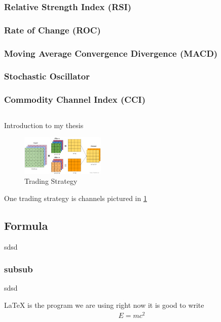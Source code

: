 \documentclass[a4paper,12pt]{report}
\begin{document}
			\subsubsection{Relative Strength Index (RSI)}
			\subsubsection{Rate of Change (ROC)}
			\subsubsection{Moving Average Convergence Divergence (MACD)}
			\subsubsection{Stochastic Oscillator}
			\subsubsection{Commodity Channel Index (CCI)}

		\subsection{}







Introduction to my thesis
\begin{figure}[h]
\begin{center}
\includegraphics[width=4cm]{images/CNN_filters.png}
\caption{Trading Strategy}
\label{trading_strategy}
\end{center}
\end{figure}

One trading strategy is channels pictured in \ref{trading_strategy}

\subsection{Formula}
sdsd 
\subsubsection{subsub}
sdsd

\LaTeX{} is the program we are using right now
it is good to write 
\begin{align}
E=mc^2
\end{align}
\end{document}

